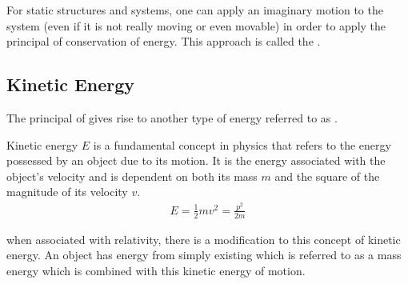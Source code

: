 For static structures and systems, one can apply an imaginary motion to the system (even if it is not really moving or even movable) in order to apply the principal of conservation of energy. This approach is called the .

\subsection{Kinetic Energy}

The principal of  gives rise to another type of energy referred to as .

\begin{defn}
	Kinetic energy $E$ is a fundamental concept in physics that refers to the energy possessed by an object due to its motion. It is the energy associated with the object's velocity and is dependent on both its mass $m$ and the square of the magnitude of its velocity $v$. 
	\begin{align}
		E = \frac{1}{2}mv^2 = \frac{p^2}{2m}
	\end{align}
\end{defn} 

when associated with relativity, there is a modification to this concept of kinetic energy. An object has energy from simply existing which is referred to as a mass energy which is combined with this kinetic energy of motion.







